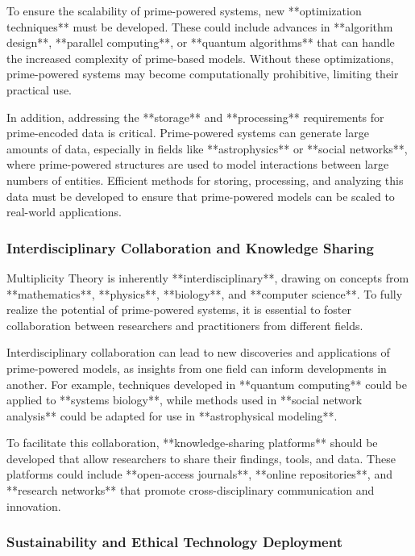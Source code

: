 \documentclass[12pt]{article}
\begin{document}
To ensure the scalability of prime-powered systems, new **optimization techniques** must be developed. These could include advances in **algorithm design**, **parallel computing**, or **quantum algorithms** that can handle the increased complexity of prime-based models. Without these optimizations, prime-powered systems may become computationally prohibitive, limiting their practical use.

In addition, addressing the **storage** and **processing** requirements for prime-encoded data is critical. Prime-powered systems can generate large amounts of data, especially in fields like **astrophysics** or **social networks**, where prime-powered structures are used to model interactions between large numbers of entities. Efficient methods for storing, processing, and analyzing this data must be developed to ensure that prime-powered models can be scaled to real-world applications.

\subsubsection{Interdisciplinary Collaboration and Knowledge Sharing}

Multiplicity Theory is inherently **interdisciplinary**, drawing on concepts from **mathematics**, **physics**, **biology**, and **computer science**. To fully realize the potential of prime-powered systems, it is essential to foster collaboration between researchers and practitioners from different fields.

Interdisciplinary collaboration can lead to new discoveries and applications of prime-powered models, as insights from one field can inform developments in another. For example, techniques developed in **quantum computing** could be applied to **systems biology**, while methods used in **social network analysis** could be adapted for use in **astrophysical modeling**.

To facilitate this collaboration, **knowledge-sharing platforms** should be developed that allow researchers to share their findings, tools, and data. These platforms could include **open-access journals**, **online repositories**, and **research networks** that promote cross-disciplinary communication and innovation.

\subsubsection{Sustainability and Ethical Technology Deployment}
\end{document}
